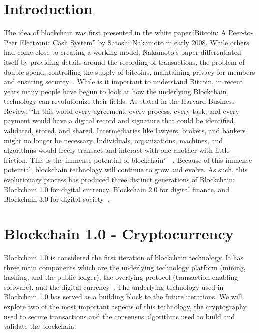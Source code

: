\section{Introduction}
The idea of blockchain was first presented in the white paper``Bitcoin: A Peer-to-Peer Electronic Cash System'' by Satoshi Nakamoto in early 2008. While others had come close to creating a working model, Nakamoto’s paper differentiated itself by providing details around the recording of transactions, the problem of double spend, controlling the supply of bitcoins, maintaining privacy for members and ensuring security~\cite{hid-sp18-414-www-blockchain-theory-application}. While is it important to understand Bitcoin, in recent years many people have begun to look at how the underlying Blockchain technology can revolutionize their fields.  As stated in the Harvard Business Review, ``In this world every agreement, every process, every task, and every payment would have a digital record and signature that could be identified, validated, stored, and shared. Intermediaries like lawyers, brokers, and bankers might no longer be necessary. Individuals, organizations, machines, and algorithms would freely transact and interact with one another with little friction. This is the immense potential of blockchain'' ~\cite{hid-sp18-414-Truth-Blockchain}. Because of this immense potential, blockchain technology will continue to grow and evolve.  As such, this evolutionary process has produced three distinct generations of Blockchain: Blockchain 1.0 for digital currency, Blockchain 2.0 for digital finance, and Blockchain 3.0 for digital society~\cite{hid-sp18-414-financialinnovation-zhao}.

\section{Blockchain 1.0 - Cryptocurrency}

Blockchain 1.0 is considered the first iteration of blockchain technology. It has three main components which are the underlying technology platform (mining, hashing, and the public ledger), the overlying protocol (transaction enabling software), and the digital currency~\cite{hid-sp18-414-www-promise-bitcoin-blockchain}. The underlying technology used in Blockchain 1.0 has served as a building block to the future iterations. We will explore two of the most important aspects of this technology, the cryptography used to secure transactions and the consensus algorithms used to build and validate the blockchain. 


